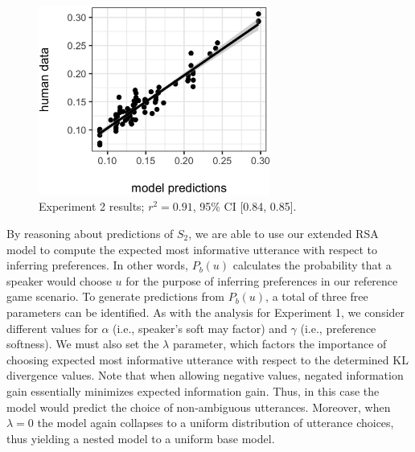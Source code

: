 \documentclass[10pt,a4paper]{article}
\begin{document}
\begin{figure}[ht]
	\centering
	\includegraphics[width=3in]{images/X3-scatter-CogSci.eps}
	\caption{Experiment 2 results; $r^{2}=0.91$, 95\% CI [0.84, 0.85].}\label{exp2-results}
\end{figure}




By reasoning about predictions of $S_2$, we are able to use our extended RSA model to compute the expected most informative utterance with respect to inferring preferences. In other words, $P_b(u)$ calculates the probability that a speaker would choose $u$ for the purpose of inferring preferences in our reference game scenario.
To generate predictions from $P_b(u)$, a total of three free parameters can be identified. 
As with the analysis for Experiment 1, we consider different values for $\alpha$ (i.e., speaker's soft may factor) and $\gamma$ (i.e., preference softness). 
We must also set the $\lambda$ parameter, which factors the importance of choosing expected most informative utterance with respect to the determined KL divergence values.
Note that when allowing negative values, negated information gain essentially minimizes expected information gain.
Thus, in this case the model would predict the choice of non-ambiguous utterances. 
Moreover, when $\lambda=0$ the model again collapses to a uniform distribution of utterance choices, thus yielding a nested model to a uniform base model. 
\end{document}
